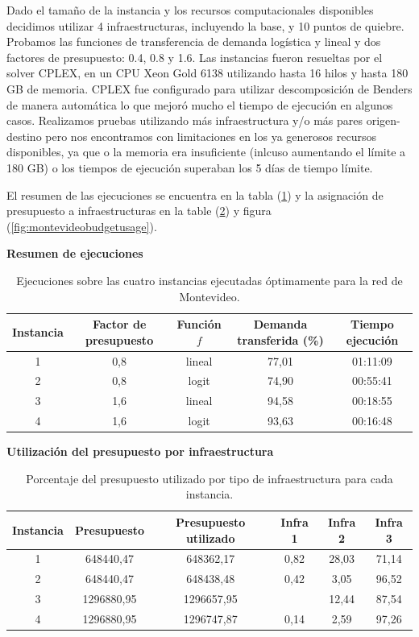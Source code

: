 \documentclass{article}
\begin{document}
  Dado el tamaño de la instancia y los recursos computacionales disponibles decidimos utilizar 4 infraestructuras, incluyendo la base, y 10 puntos de quiebre. Probamos las funciones de transferencia de demanda logística y lineal y dos factores de presupuesto: 0.4, 0.8 y 1.6. Las instancias fueron resueltas por el solver CPLEX, en un CPU Xeon Gold 6138 utilizando hasta 16 hilos y hasta 180 GB de memoria. CPLEX fue configurado para utilizar descomposición de Benders de manera automática lo que mejoró mucho el tiempo de ejecución en algunos casos. Realizamos pruebas utilizando más infraestructura y/o más pares origen-destino pero nos encontramos con limitaciones en los ya generosos recursos disponibles, ya que o la memoria era insuficiente (inlcuso aumentando el límite a 180 GB) o los tiempos de ejecución superaban los 5 días de tiempo límite.

  El resumen de las ejecuciones se encuentra en la tabla (\ref{table:montevideoexecutions}) y la asignación de presupuesto a infraestructuras en la table (\ref{table:montevideobudgetusage}) y figura (\ref{fig:montevideobudgetusage}).

  \begin{table}[h!]
    \centering
    \caption*{{\bf Resumen de ejecuciones}}
    \begin{tabular}{ccccc}
      \toprule
        Instancia & Factor de presupuesto & Función $f$ & Demanda transferida (\%) & Tiempo ejecución \\
      \midrule
        1 & 0,8 & lineal & 77,01 & 01:11:09 \\
        2 & 0,8 & logit & 74,90 & 00:55:41 \\
        3 & 1,6 & lineal & 94,58 & 00:18:55 \\
        4 & 1,6 & logit & 93,63 & 00:16:48 \\
      \bottomrule
    \end{tabular}
      \caption{Ejecuciones sobre las cuatro instancias ejecutadas óptimamente para la red de Montevideo.}\label{table:montevideoexecutions}
  \end{table}

  \begin{table}[h!]
    \centering
    \caption*{{\bf Utilización del presupuesto por infraestructura}}
    \begin{tabular}{cccccc}
      \toprule
         Instancia & Presupuesto & Presupuesto utilizado & Infra 1 & Infra 2 & Infra 3 \\
      \midrule
         1 & 648440,47 & 648362,17 & 0,82 & 28,03 & 71,14 \\
         2 & 648440,47 & 648438,48 & 0,42 & 3,05 & 96,52 \\
         3 & 1296880,95 & 1296657,95 &  & 12,44 & 87,54 \\
         4 & 1296880,95 & 1296747,87 & 0,14 & 2,59 & 97,26 \\
      \bottomrule
    \end{tabular}
      \caption{Porcentaje del presupuesto utilizado por tipo de infraestructura para cada instancia.}\label{table:montevideobudgetusage}
  \end{table}
\end{document}
